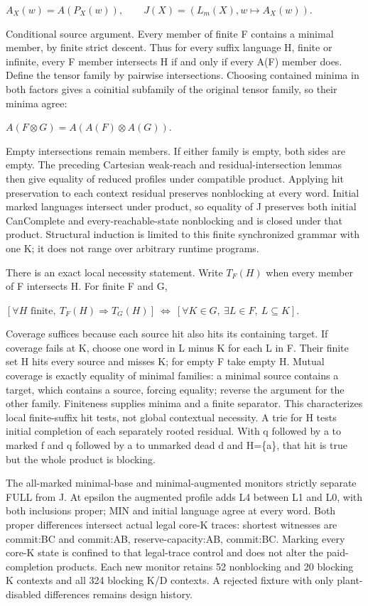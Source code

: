 \documentclass[11pt,a4paper]{article}
\theoremstyle{definition}
\theoremstyle{remark}
\begin{document}
$A_X(w)=A(P_X(w)),\qquad J(X)=(L_m(X),w\mapsto A_X(w)).$

Conditional source argument. Every member of finite F contains a minimal member, by finite strict descent. Thus for every suffix language H, finite or infinite, every F member intersects H if and only if every A(F) member does. Define the tensor family by pairwise intersections. Choosing contained minima in both factors gives a coinitial subfamily of the original tensor family, so their minima agree:

$A(F\otimes G)=A(A(F)\otimes A(G)).$

Empty intersections remain members. If either family is empty, both sides are empty. The preceding Cartesian weak-reach and residual-intersection lemmas then give equality of reduced profiles under compatible product. Applying hit preservation to each context residual preserves nonblocking at every word. Initial marked languages intersect under product, so equality of J preserves both initial CanComplete and every-reachable-state nonblocking and is closed under that product. Structural induction is limited to this finite synchronized grammar with one K; it does not range over arbitrary runtime programs.

There is an exact local necessity statement. Write $T_F(H)$ when every member of F intersects H. For finite F and G,

$[\forall H\text{ finite},\ T_F(H)\Rightarrow T_G(H)]\ \Longleftrightarrow\ [\forall K\in G,\ \exists L\in F,\ L\subseteq K].$

Coverage suffices because each source hit also hits its containing target. If coverage fails at K, choose one word in L minus K for each L in F. Their finite set H hits every source and misses K; for empty F take empty H. Mutual coverage is exactly equality of minimal families: a minimal source contains a target, which contains a source, forcing equality; reverse the argument for the other family. Finiteness supplies minima and a finite separator. This characterizes local finite-suffix hit tests, not global contextual necessity. A trie for H tests initial completion of each separately rooted residual. With q followed by a to marked f and q followed by a to unmarked dead d and H=\{a\}, that hit is true but the whole product is blocking.

The all-marked minimal-base and minimal-augmented monitors strictly separate FULL from J. At epsilon the augmented profile adds L4 between L1 and L0, with both inclusions proper; MIN and initial language agree at every word. Both proper differences intersect actual legal core-K traces: shortest witnesses are commit:BC and commit:AB, reserve-capacity:AB, commit:BC. Marking every core-K state is confined to that legal-trace control and does not alter the paid-completion products. Each new monitor retains 52 nonblocking and 20 blocking K contexts and all 324 blocking K/D contexts. A rejected fixture with only plant-disabled differences remains design history.
\end{document}
